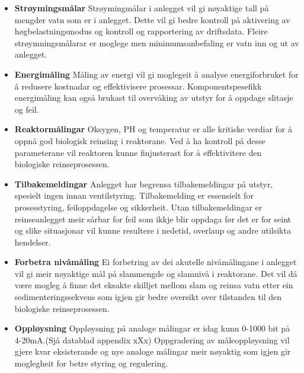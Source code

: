 \begin{itemize}
    \item \textbf{Strøymingsmålar} \newline
        Strøymingmålar i anlegget vil gi nøyaktige tall på mengder vatn som er i anlegget.
        Dette vil gi bedre kontroll på aktivering av høgbelastningsmodus og kontroll og rapportering av driftsdata.
        Fleire strøymningsmålarar er moglege men minimumsanbefaling er vatn inn og ut av anlegget.
    \item \textbf{Energimåling} \newline
        Måling av energi vil gi moglegeit å analyse energiforbruket for å redusere kostnadar og effektivisere prosessar.
        Komponentspesefikk energimåling kan også brukast til overvåking av utstyr for å oppdage slitasje og feil.
    \item \textbf{Reaktormålingar} \newline
        Oksygen, PH og temperatur er alle kritiske verdiar for å oppnå god biologisk reinsing i reaktorane. \newline
        Ved å ha kontroll på desse parameterane vil reaktoren kunne finjusterast for å effektivitere den biologiske reinseprosessen.
    \item \textbf{Tilbakemeldingar} \newline
        Anlegget har begrensa tilbakemeldingar på utstyr, spesielt ingen innan ventilstyring.
        Tilbakemelding er essensielt for prosesstyring, feiloppdagelse og sikkerheit.
        Utan tilbakemeldingar er reinseanlegget meir sårbar for feil som ikkje blir oppdaga før det er for seint 
        og slike situasjonar vil kunne resultere i nedetid, overlaup og andre utilsikta hendelser.
    \item \textbf{Forbetra nivåmåling} \newline
        Ei forbetring av dei akutelle nivåmålingane i anlegget vil gi meir nøyaktige mål på slammengde og slamnivå i reaktorane.
        Det vil då være mogleg å finne det eksakte skilljet mellom slam og reinsa vatn etter ein sedimenteringssekvens som igjen
        gir bedre oversikt over tilstanden til den biologiske reinseprosessen.
    \item \textbf{Oppløysning} \newline
        Oppløysning på analoge målingar er idag kunn 0-1000 bit på 4-20mA.(Sjå datablad appendix xXx) \newline
        Oppgradering av måleoppløysning vil gjere kvar eksisterande og nye analoge målingar
        meir nøyaktig som igjen gir moglegheit for betre styring og regulering.
\end{itemize}
\newpage

